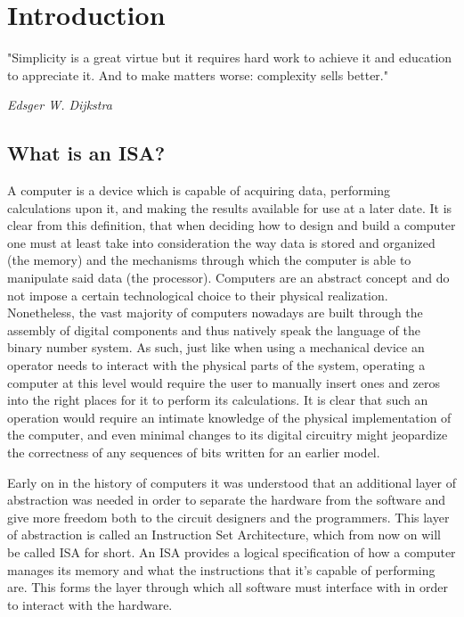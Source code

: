 \chapter{Introduction}
\epigraph{"Simplicity is a great virtue but it requires hard work to achieve it and education to appreciate it. And to make matters worse: complexity sells better."}{\textit{Edsger W. Dijkstra}}

\section*{What is an ISA?}

A computer is a device which is capable of acquiring data, performing calculations upon it, and making the results available for use at a later date.
It is clear from this definition, that when deciding how to design and build a computer one must at least take into consideration the way data is 
stored and organized (the memory) and the mechanisms through which the computer is able to manipulate said data (the processor).
Computers are an abstract concept and do not impose a certain technological choice to their physical realization. Nonetheless, the vast majority of computers nowadays
are built through the assembly of digital components and thus natively speak the language of the binary number system.
As such, just like when using a mechanical device an operator needs to interact with the physical parts of the system,  operating a computer at this level
would require the user to manually insert ones and zeros into the right places for it to perform its calculations.
It is clear that such an operation would require an intimate knowledge of the physical implementation of the computer, and even minimal
changes to its digital circuitry might jeopardize the correctness of any sequences of bits written for an earlier model.

Early on in the history of computers it was understood that an additional layer of abstraction was needed in order to separate the hardware from the software
and give more freedom both to the circuit designers and the programmers. This layer of abstraction is called an Instruction Set Architecture,
which from now on will be called ISA for short. An ISA provides a logical specification of how a computer manages its memory and what the instructions that it's
capable of performing are. This forms the layer through which all software must interface with in order to interact with the hardware.

